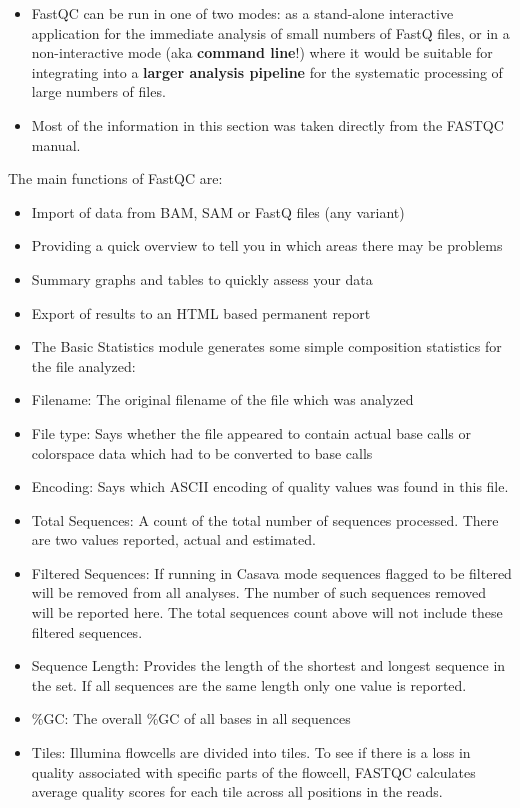 \documentclass[
]{article}
\providecommand{\tightlist}{%
  \setlength{\itemsep}{0pt}\setlength{\parskip}{0pt}}
\begin{document}
\begin{itemize}
\item
  FastQC can be run in one of two modes: as a stand-alone interactive
  application for the immediate analysis of small numbers of FastQ
  files, or in a non-interactive mode (aka \textbf{command line}!) where
  it would be suitable for integrating into a \textbf{larger analysis
  pipeline} for the systematic processing of large numbers of files.
\item
  Most of the information in this section was taken directly from the
  FASTQC manual.
\end{itemize}

The main functions of FastQC are:

\begin{itemize}
\tightlist
\item
  Import of data from BAM, SAM or FastQ files (any variant)
\item
  Providing a quick overview to tell you in which areas there may be
  problems
\item
  Summary graphs and tables to quickly assess your data
\item
  Export of results to an HTML based permanent report
\item
  The Basic Statistics module generates some simple composition
  statistics for the file analyzed:
\item
  Filename: The original filename of the file which was analyzed\\
\item
  File type: Says whether the file appeared to contain actual base calls
  or colorspace data which had to be converted to base calls\\
\item
  Encoding: Says which ASCII encoding of quality values was found in
  this file.\\
\item
  Total Sequences: A count of the total number of sequences processed.
  There are two values reported, actual and estimated.
\item
  Filtered Sequences: If running in Casava mode sequences flagged to be
  filtered will be removed from all analyses. The number of such
  sequences removed will be reported here. The total sequences count
  above will not include these filtered sequences.
\item
  Sequence Length: Provides the length of the shortest and longest
  sequence in the set. If all sequences are the same length only one
  value is reported.
\item
  \%GC: The overall \%GC of all bases in all sequences
\item
  Tiles: Illumina flowcells are divided into tiles. To see if there is a
  loss in quality associated with specific parts of the flowcell, FASTQC
  calculates average quality scores for each tile across all positions
  in the reads.
\end{itemize}
\end{document}
